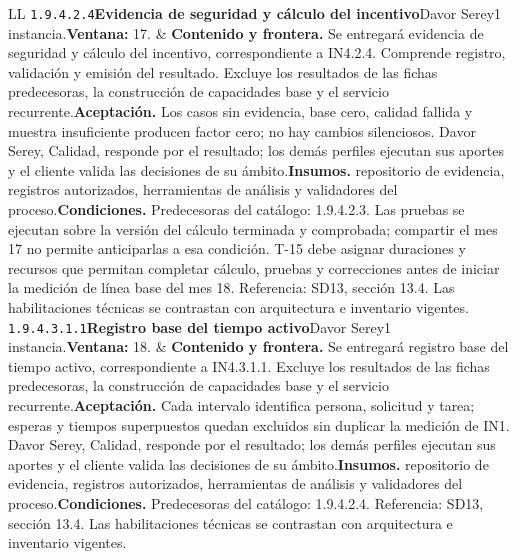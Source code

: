\begin{longtable}{L{\tabcolsep\relax}L{\tabcolsep\relax}}
\texttt{1.\allowbreak{}9.\allowbreak{}4.\allowbreak{}2.\allowbreak{}4}\newline{}\textbf{Evidencia de seguridad y cálculo del incentivo}\newline{}Davor Serey\newline{}1 instancia.\newline{}\textbf{Ventana:} 17. & \textbf{Contenido y frontera.} Se entregará evidencia de seguridad y cálculo del incentivo, correspondiente a IN4.2.4. Comprende registro, validación y emisión del resultado. Excluye los resultados de las fichas predecesoras, la construcción de capacidades base y el servicio recurrente.\newline{}\textbf{Aceptación.} Los casos sin evidencia, base cero, calidad fallida y muestra insuficiente producen factor cero; no hay cambios silenciosos. Davor Serey, Calidad, responde por el resultado; los demás perfiles ejecutan sus aportes y el cliente valida las decisiones de su ámbito.\newline{}\textbf{Insumos.} repositorio de evidencia, registros autorizados, herramientas de análisis y validadores del proceso.\newline{}\textbf{Condiciones.} Predecesoras del catálogo: 1.9.4.2.3. Las pruebas se ejecutan sobre la versión del cálculo terminada y comprobada; compartir el mes 17 no permite anticiparlas a esa condición. T-15 debe asignar duraciones y recursos que permitan completar cálculo, pruebas y correcciones antes de iniciar la medición de línea base del mes 18. Referencia: SD13, sección 13.4. Las habilitaciones técnicas se contrastan con arquitectura e inventario vigentes.\\\hline
\texttt{1.\allowbreak{}9.\allowbreak{}4.\allowbreak{}3.\allowbreak{}1.\allowbreak{}1}\newline{}\textbf{Registro base del tiempo activo}\newline{}Davor Serey\newline{}1 instancia.\newline{}\textbf{Ventana:} 18. & \textbf{Contenido y frontera.} Se entregará registro base del tiempo activo, correspondiente a IN4.3.1.1. Excluye los resultados de las fichas predecesoras, la construcción de capacidades base y el servicio recurrente.\newline{}\textbf{Aceptación.} Cada intervalo identifica persona, solicitud y tarea; esperas y tiempos superpuestos quedan excluidos sin duplicar la medición de IN1. Davor Serey, Calidad, responde por el resultado; los demás perfiles ejecutan sus aportes y el cliente valida las decisiones de su ámbito.\newline{}\textbf{Insumos.} repositorio de evidencia, registros autorizados, herramientas de análisis y validadores del proceso.\newline{}\textbf{Condiciones.} Predecesoras del catálogo: 1.9.4.2.4. Referencia: SD13, sección 13.4. Las habilitaciones técnicas se contrastan con arquitectura e inventario vigentes.\\\hline

\end{longtable}
